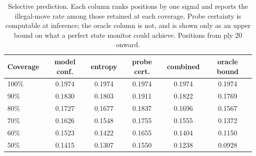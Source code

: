 \begin{table}[t]
\centering\small
\caption{Selective prediction. Each column ranks positions by one signal
and reports the illegal-move rate among those retained at each coverage.
Probe certainty is computable at inference; the oracle column is not, and
is shown only as an upper bound on what a perfect state monitor could
achieve. Positions from ply 20 onward.}
\label{tab:abstain}
\begin{tabular}{lccccc}
\toprule
Coverage & model conf. & entropy & probe cert. & combined & oracle bound \\
\midrule
100\% & 0.1974 & 0.1974 & 0.1974 & 0.1974 & 0.1974 \\
90\% & 0.1830 & 0.1803 & 0.1911 & 0.1822 & 0.1769 \\
80\% & 0.1727 & 0.1677 & 0.1837 & 0.1696 & 0.1567 \\
70\% & 0.1626 & 0.1548 & 0.1755 & 0.1555 & 0.1372 \\
60\% & 0.1523 & 0.1422 & 0.1655 & 0.1404 & 0.1150 \\
50\% & 0.1415 & 0.1307 & 0.1550 & 0.1238 & 0.0928 \\
\bottomrule
\end{tabular}
\end{table}
